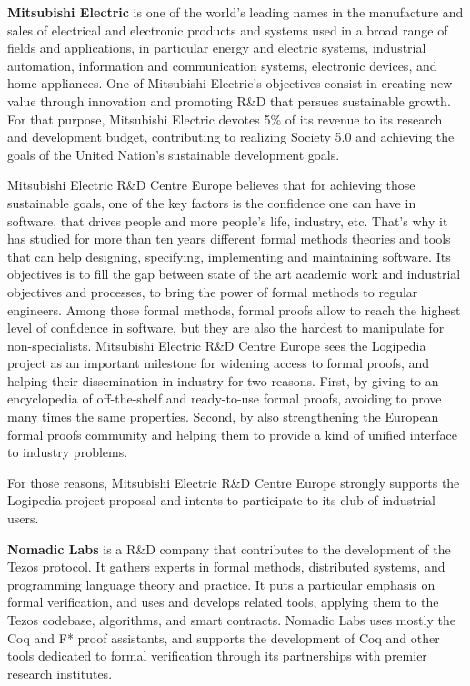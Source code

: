 {{\bf Mitsubishi Electric} is one of the world's leading names in the
manufacture and sales of electrical and electronic products and
systems used in a broad range of fields and applications, in
particular energy and electric systems, industrial automation,
information and communication systems, electronic devices, and home
appliances. One of Mitsubishi Electric's objectives consist in
creating new value through innovation and promoting R\&D that persues
sustainable growth. For that purpose, Mitsubishi Electric devotes 5\%
of its revenue to its research and development budget, contributing to
realizing Society 5.0 and achieving the goals of the United Nation's
sustainable development goals.

Mitsubishi Electric R\&D Centre Europe believes that for achieving
those sustainable goals, one of the key factors is the confidence one
can have in software, that drives people and more people's life,
industry, etc. That's why it has studied for more than ten years
different formal methods theories and tools that can help designing,
specifying, implementing and maintaining software. Its objectives is
to fill the gap between state of the art academic work and industrial
objectives and processes, to bring the power of formal methods to
regular engineers. Among those formal methods, formal proofs allow to
reach the highest level of confidence in software, but they are also
the hardest to manipulate for non-specialists. Mitsubishi Electric
R\&D Centre Europe sees the Logipedia project as an important
milestone for widening access to formal proofs, and helping their
dissemination in industry for two reasons. First, by giving to an
encyclopedia of off-the-shelf and ready-to-use formal proofs, avoiding
to prove many times the same properties. Second, by also strengthening
the European formal proofs community and helping them to provide a
kind of unified interface to industry problems.

For those reasons, Mitsubishi Electric R\&D Centre Europe strongly
supports the Logipedia project proposal and intents to participate to
its club of industrial users.

{\bf Nomadic Labs} is a R\&D company that contributes to the
development of the Tezos protocol. It gathers experts in formal
methods, distributed systems, and programming language theory and
practice. It puts a particular emphasis on formal verification, and
uses and develops related tools, applying them to the Tezos codebase,
algorithms, and smart contracts. Nomadic Labs uses mostly the Coq and
F* proof assistants, and supports the development of Coq and other
tools dedicated to formal verification through its partnerships with
premier research institutes.

}
